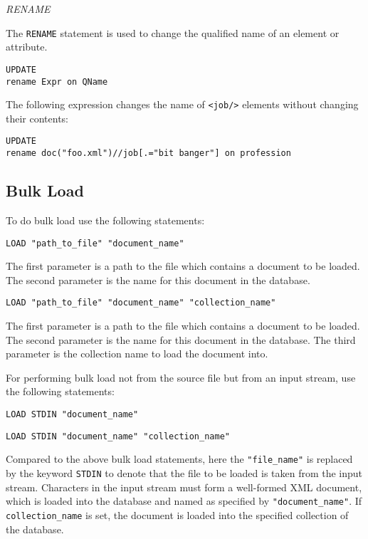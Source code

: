 \documentclass[a4paper,12pt]{article}
\begin{document}
\emph{RENAME}

The \verb!RENAME! statement is used to change the qualified name of an element or attribute.

\begin{verbatim}
UPDATE
rename Expr on QName
\end{verbatim}

The following expression changes the name of \verb!<job/>! elements without changing their contents:
\begin{verbatim}
UPDATE
rename doc("foo.xml")//job[.="bit banger"] on profession
\end{verbatim}

\subsection{Bulk Load}
\label{bulk-load}
To do bulk load use the following statements:
\begin{verbatim}
LOAD "path_to_file" "document_name"
\end{verbatim}

The first parameter is a path to the file which contains a document to be loaded. The second parameter is the name for this document in the database.

\begin{verbatim}
LOAD "path_to_file" "document_name" "collection_name"
\end{verbatim}

The first parameter is a path to the file which contains a document to be loaded. The second parameter is the name for this document in the database. The third parameter is the collection name to load the document into.

For performing bulk load not from the source file but from an input stream,
use the following statements:
\begin{verbatim}LOAD STDIN "document_name"\end{verbatim}

\begin{verbatim}LOAD STDIN "document_name" "collection_name"\end{verbatim}

Compared to the above bulk load statements, here the
\verb!"file_name"! is replaced by the keyword \verb!STDIN! to denote that
the file to be loaded is taken from the input stream. Characters in the input stream must form a well-formed XML document, which is loaded into the database and named as specified by
\verb!"document_name"!. If \verb!collection_name! is set, the document is loaded into the specified collection of the database.
\end{document}
